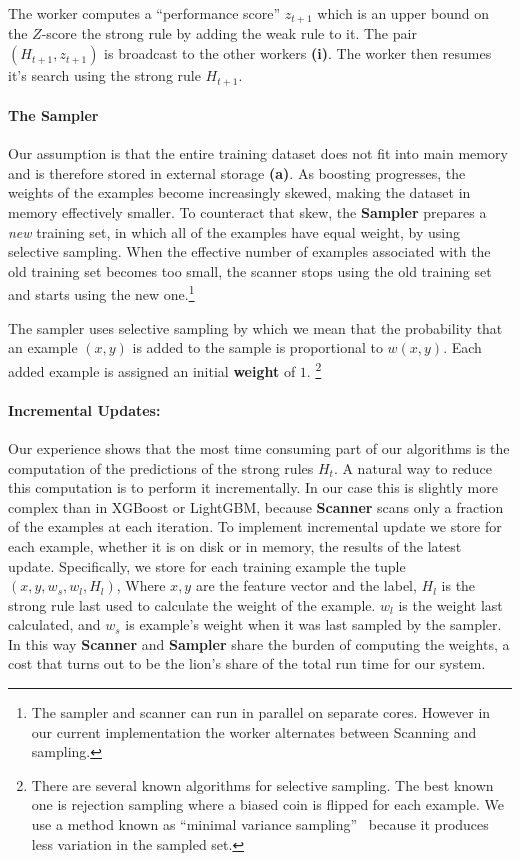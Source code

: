 The worker computes a ``performance score'' $z_{t+1}$ which is an
upper bound on the $Z$-score the strong rule by adding the weak rule
to it. The pair $(H_{t+1},z_{t+1})$ is broadcast to the other workers
{\bf (i)}. The worker then resumes it's search using the strong rule
$H_{t+1}$.
\paragraph*{The Sampler} Our assumption is that the entire training dataset does
not fit into main memory and is therefore stored in external storage
{\bf (a)}. As boosting progresses, the weights of the examples become
increasingly skewed, making the dataset in memory effectively smaller.
To counteract that skew, the {\bf Sampler} prepares a {\em new}
training set, in which all of the examples have equal weight, by using
selective sampling. When the effective number of examples associated
with the old training set becomes too small, the scanner stops using
the old training set and starts using the new one.\footnote{The
  sampler and scanner can run in parallel on separate cores. However in
  our current implementation the worker alternates between Scanning and
  sampling.}

The sampler uses selective sampling by which we mean that the
probability that an example $(x,y)$ is added to the sample is
proportional to $w(x,y)$. Each added example is assigned an initial
{\bf weight} of $1$.
\footnote{There are several known algorithms
  for selective sampling. The best known one is rejection sampling
  where a biased coin is flipped for each example. We use a method
  known as ``minimal variance sampling''~\cite{kitagawa_monte_1996}
  because it produces less variation in the sampled set.}
\paragraph*{Incremental Updates:} Our experience shows that the most
time consuming part of our algorithms is the computation of the
predictions of the strong rules $H_t$. A natural way to reduce this
computation is to perform it incrementally. In our case this is
slightly more complex than in XGBoost or LightGBM, because {\bf
  Scanner} scans only a  fraction of the examples at each
iteration. To implement incremental update we store for each example,
whether it is on disk or in memory, the results of the latest
update. Specifically, we store for each training example the tuple
$(x, y, w_s, w_l,H_l)$, Where $x,y$ are the feature vector and the
label, $H_l$ is the strong rule last used to calculate the weight of
the example. $w_l$ is the weight last calculated, and $w_s$ is
example's weight when it was last sampled by the sampler. In this way
{\bf Scanner} and {\bf Sampler} share the burden of computing
the weights, a cost that turns out to be the lion's share of the total
run time for our system.


